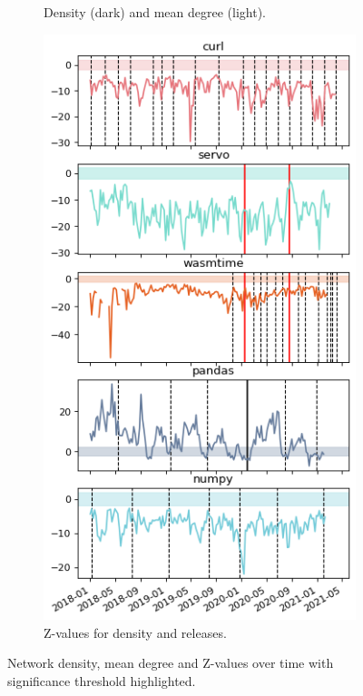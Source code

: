 \begin{figure}
\begin{subfigure}{0.53\textwidth}
        \caption{Density (dark) and mean degree (light).}
        \label{fig:density_a}
    \end{subfigure}
    \begin{subfigure}{0.46\textwidth}
        \centering
        \includegraphics[width=\textwidth]{figures/qualitative/mean_deg_density/mean_deg_z_values.png}
        \caption{Z-values for density and releases.}
        \label{fig:density_b}
    \end{subfigure}
    \caption{Network density, mean degree and Z-values over time with significance threshold highlighted.}
    \label{fig:density}
\end{figure}

